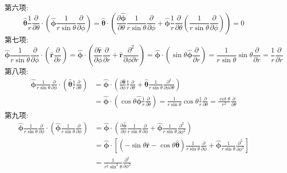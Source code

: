 第六项:
\[
\hat{\boldsymbol{\theta}}\frac{1}{r}\frac{\partial}{\partial \theta} \cdot \left(\hat{\boldsymbol{\phi}}\frac{1}{r\sin\theta}\frac{\partial}{\partial \phi}\right) = \hat{\boldsymbol{\theta}} \cdot \left(\frac{\partial\hat{\boldsymbol{\phi}}}{\partial \theta}\frac{1}{r\sin\theta}\frac{\partial}{\partial \phi} + \hat{\boldsymbol{\phi}}\frac{1}{r}\frac{\partial}{\partial \theta}\left(\frac{1}{r\sin\theta}\frac{\partial}{\partial \phi}\right)\right) = 0
\]
第七项:
\[
\hat{\boldsymbol{\phi}}\frac{1}{r\sin\theta}\frac{\partial}{\partial \phi} \cdot \left(\hat{\mathbf{r}}\frac{\partial}{\partial r}\right) = \hat{\boldsymbol{\phi}} \cdot \left(\frac{\partial\hat{\mathbf{r}}}{\partial \phi}\frac{\partial}{\partial r} + \hat{\mathbf{r}}\frac{\partial^2}{\partial\phi\partial r}\right) = \hat{\boldsymbol{\phi}} \cdot \left(\sin\theta\hat{\boldsymbol{\phi}}\frac{\partial}{\partial r}\right) = \frac{1}{r\sin\theta}\sin\theta\frac{\partial}{\partial r} = \frac{1}{r}\frac{\partial}{\partial r}
\]
第八项:
\[\begin{aligned}
\hat{\boldsymbol{\phi}}\frac{1}{r\sin\theta}\frac{\partial}{\partial \phi} \cdot \left(\hat{\boldsymbol{\theta}}\frac{1}{r}\frac{\partial}{\partial \theta}\right) &= \hat{\boldsymbol{\phi}} \cdot \left(\frac{\partial\hat{\boldsymbol{\theta}}}{\partial \phi}\frac{1}{r}\frac{\partial}{\partial \theta} + \hat{\boldsymbol{\theta}}\frac{1}{r\sin\theta}\frac{\partial^2}{\partial\phi\partial\theta}\right)\\
&= \hat{\boldsymbol{\phi}} \cdot \left(\cos\theta\hat{\boldsymbol{\phi}}\frac{1}{r}\frac{\partial}{\partial \theta}\right) = \frac{1}{r\sin\theta}\cos\theta\frac{1}{r}\frac{\partial}{\partial \theta} = \frac{\cot\theta}{r^2}\frac{\partial}{\partial \theta}
\end{aligned}\]
第九项:
\[\begin{aligned}
\hat{\boldsymbol{\phi}}\frac{1}{r\sin\theta}\frac{\partial}{\partial \phi} \cdot \left(\hat{\boldsymbol{\phi}}\frac{1}{r\sin\theta}\frac{\partial}{\partial \phi}\right) &= \hat{\boldsymbol{\phi}} \cdot \left(\frac{\partial\hat{\boldsymbol{\phi}}}{\partial \phi}\frac{1}{r\sin\theta}\frac{\partial}{\partial \phi} + \hat{\boldsymbol{\phi}}\frac{1}{r\sin\theta}\frac{\partial^2}{\partial\phi^2}\right)\\
&= \hat{\boldsymbol{\phi}} \cdot \left[(-\sin\theta\hat{\mathbf{r}} - \cos\theta\hat{\boldsymbol{\theta}})\frac{1}{r\sin\theta}\frac{\partial}{\partial \phi} + \hat{\boldsymbol{\phi}}\frac{1}{r\sin\theta}\frac{\partial^2}{\partial\phi^2}\right]\\
&= \frac{1}{r^2\sin^2\theta}\frac{\partial^2}{\partial\phi^2}
\end{aligned}
\]

